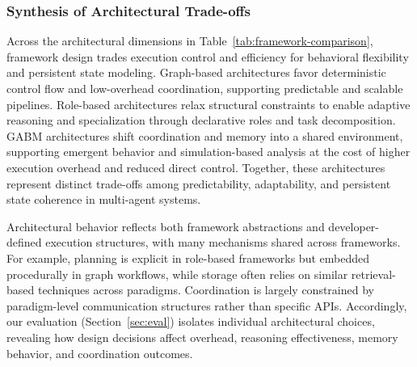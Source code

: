 \vspace{-1mm}
\subsubsection{Synthesis of Architectural Trade-offs}

Across the architectural dimensions in Table~\ref{tab:framework-comparison}, framework design trades execution control and efficiency for behavioral flexibility and persistent state modeling. Graph-based architectures favor deterministic control flow and low-overhead coordination, supporting predictable and scalable pipelines. Role-based architectures relax structural constraints to enable adaptive reasoning and specialization through declarative roles and task decomposition. GABM architectures shift coordination and memory into a shared environment, supporting emergent behavior and simulation-based analysis at the cost of higher execution overhead and reduced direct control. Together, these architectures represent distinct trade-offs among predictability, adaptability, and persistent state coherence in multi-agent systems.

Architectural behavior reflects both framework abstractions and developer-defined execution structures, with many mechanisms shared across frameworks. For example, planning is explicit in role-based frameworks but embedded procedurally in graph workflows, while storage often relies on similar retrieval-based techniques across paradigms. Coordination is largely constrained by paradigm-level communication structures rather than specific APIs. Accordingly, our evaluation (Section~\ref{sec:eval}) isolates individual architectural choices, revealing how design decisions affect overhead, reasoning effectiveness, memory behavior, and coordination outcomes.\shorten

